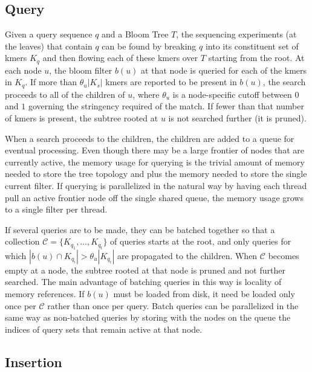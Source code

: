 \documentclass[11pt]{article}
\begin{document}



\subsection{Query}

Given a query sequence $q$ and a Bloom Tree $T$, the sequencing experiments (at the leaves) that contain $q$ can be found by breaking $q$ into its constituent set of kmers $K_q$ and then flowing each of these kmers over $T$ starting from the root. At each node $u$, the bloom filter $b(u)$ at that node is queried for each of the kmers in $K_q$. If more than $\theta_u|K_s|$ kmers are reported to be present in $b(u)$, the search proceeds to all of the children of $u$, where $\theta_u$ is a node-specific cutoff between $0$ and $1$ governing the stringency required of the match. If fewer than that number of kmers is present, the subtree rooted at $u$ is not searched further (it is pruned). 

When a search proceeds to the children, the children are added to a queue for eventual processing.  Even though there may be a large frontier of nodes that are currently active, the memory usage for querying is the trivial amount of memory needed to store the tree topology and plus the memory needed to store the single current filter. If querying is parallelized in the natural way by having each thread pull an active frontier node off the single shared queue, the memory usage grows to a single filter per thread.

If several queries are to be made, they can be batched together so that a collection $\mathcal{C} = \{K_{q_1},\dots,K_{q_t}\}$ of queries starts at the root, and only queries for which $|b(u) \cap K_{q_i}| > \theta_u |K_{q_i}|$ are propagated to the children. When $\mathcal{C}$ becomes empty at a node, the subtree rooted at that node is pruned and not further searched.
The main advantage of batching queries in this way is locality of memory references. If $b(u)$ must be loaded from disk, it need be loaded only once per $\mathcal{C}$ rather than once per query. Batch queries can be parallelized in the same way as non-batched queries by storing with the nodes on the queue the indices of query sets that remain active at that node.

\subsection{Insertion}
\end{document}
